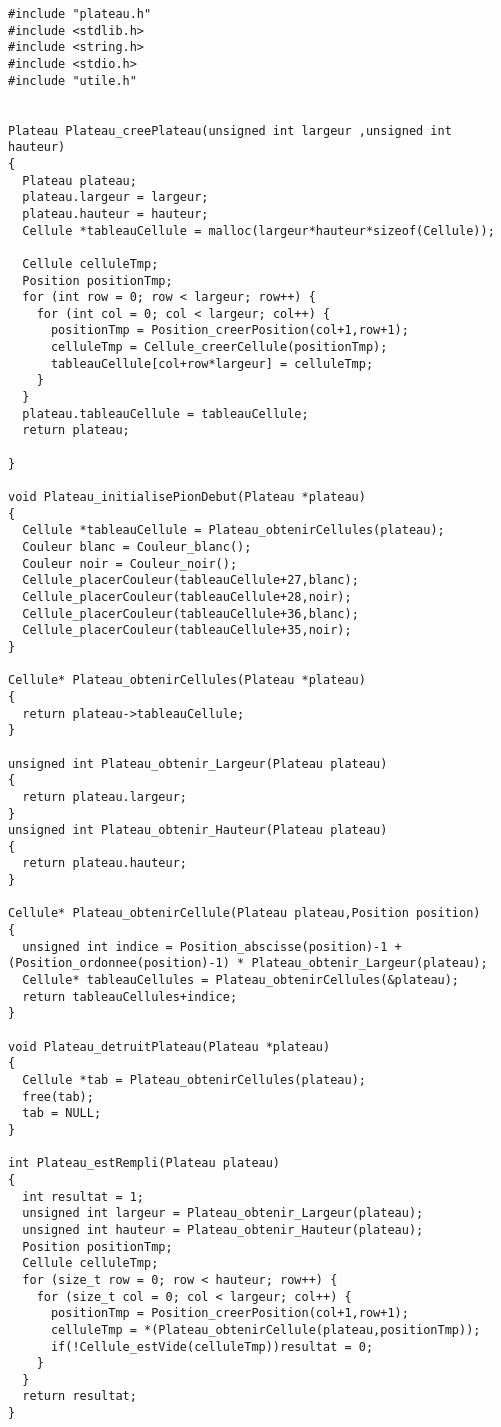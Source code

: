  
\begin{lstlisting}
#include "plateau.h"
#include <stdlib.h>
#include <string.h>
#include <stdio.h>
#include "utile.h"


Plateau Plateau_creePlateau(unsigned int largeur ,unsigned int hauteur)
{
  Plateau plateau;
  plateau.largeur = largeur;
  plateau.hauteur = hauteur;
  Cellule *tableauCellule = malloc(largeur*hauteur*sizeof(Cellule));

  Cellule celluleTmp;
  Position positionTmp;
  for (int row = 0; row < largeur; row++) {
    for (int col = 0; col < largeur; col++) {
      positionTmp = Position_creerPosition(col+1,row+1);
      celluleTmp = Cellule_creerCellule(positionTmp);
      tableauCellule[col+row*largeur] = celluleTmp;
    }
  }
  plateau.tableauCellule = tableauCellule;
  return plateau;

}

void Plateau_initialisePionDebut(Plateau *plateau)
{
  Cellule *tableauCellule = Plateau_obtenirCellules(plateau);
  Couleur blanc = Couleur_blanc();
  Couleur noir = Couleur_noir();
  Cellule_placerCouleur(tableauCellule+27,blanc);
  Cellule_placerCouleur(tableauCellule+28,noir);
  Cellule_placerCouleur(tableauCellule+36,blanc);
  Cellule_placerCouleur(tableauCellule+35,noir);
}

Cellule* Plateau_obtenirCellules(Plateau *plateau)
{
  return plateau->tableauCellule;
}

unsigned int Plateau_obtenir_Largeur(Plateau plateau)
{
  return plateau.largeur;
}
unsigned int Plateau_obtenir_Hauteur(Plateau plateau)
{
  return plateau.hauteur;
}

Cellule* Plateau_obtenirCellule(Plateau plateau,Position position)
{
  unsigned int indice = Position_abscisse(position)-1 + (Position_ordonnee(position)-1) * Plateau_obtenir_Largeur(plateau);
  Cellule* tableauCellules = Plateau_obtenirCellules(&plateau);
  return tableauCellules+indice;
}

void Plateau_detruitPlateau(Plateau *plateau)
{
  Cellule *tab = Plateau_obtenirCellules(plateau);
  free(tab);
  tab = NULL;
}

int Plateau_estRempli(Plateau plateau)
{
  int resultat = 1;
  unsigned int largeur = Plateau_obtenir_Largeur(plateau);
  unsigned int hauteur = Plateau_obtenir_Hauteur(plateau);
  Position positionTmp;
  Cellule celluleTmp;
  for (size_t row = 0; row < hauteur; row++) {
    for (size_t col = 0; col < largeur; col++) {
      positionTmp = Position_creerPosition(col+1,row+1);
      celluleTmp = *(Plateau_obtenirCellule(plateau,positionTmp));
      if(!Cellule_estVide(celluleTmp))resultat = 0;
    }
  }
  return resultat;
}


\end{lstlisting}
